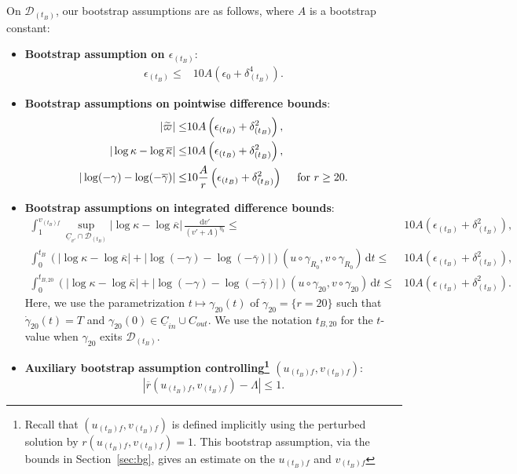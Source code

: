 \documentclass[10pt, reqno]{amsart}
\theoremstyle{definition}
\theoremstyle{remark}
\theoremstyle{conjecture}
\numberwithin{equation}{section}
\newcommand{\abs}[1]{\vert#1\vert}
\newcommand{\set}[1]{\{#1\}}
\newcommand{\ep}{\epsilon}
\newcommand{\ud}{\mathrm{d}}
\newcommand{\0}{\emptyset}
\newcommand{\gmm}{\gamma}
\newcommand{\dlt}{\delta}
\newcommand{\eps}{\epsilon}
\newcommand{\kpp}{\kappa}
\newcommand{\lmb}{\lambda}
\newcommand{\Lmb}{\Lambda}
\newcommand{\calD}{\mathcal D}
\newcommand{\uC}{\underline{C}}
\newcommand{\dur}{\nu}
\newcommand{\dvr}{\lmb}
\newcommand{\de}{\delta}
\newcommand{\rbg}{\overline{r}}					%
\newcommand{\varpibg}{\overline{\varpi}}				%
\newcommand{\kppbg}{\overline{\kpp}}					%
\newcommand{\gmmbg}{\overline{\gmm}}					%
\newcommand{\varpidf}{\widetilde{\varpi}}				%
\newcommand{\Abs}[1]{\left\vert #1 \right\vert}
\begin{document}
On $\calD_{(t_{B})}$, our bootstrap assumptions are as follows, where $A$ is a bootstrap constant:
\begin{itemize}
\item {\bf Bootstrap assumption on $\ep_{(t_B)}$}:
\begin{align}
\ep_{(t_B)}\leq & 10 A \left(\ep_0 + \de_{(t_B)}^4 \right). \label{eq:en-btstrp-eps} 
\end{align}

\item {\bf Bootstrap assumptions on pointwise difference bounds}:
\begin{align} 
	\abs{\varpidf} \leq& 10 A \left( \eps_{(t_{B})} + \dlt_{(t_{B})}^{2} \right),  \label{eq:en-btstrp-m} \\
	\abs{\log \kpp - \log \kppbg} \leq& 10 A \left( \eps_{(t_{B})} + \dlt_{(t_{B})}^{2} \right), \label{eq:en-btstrp-kpp}\\
	\abs{\log (-\gmm) - \log (-\gmmbg)} \leq& 10 \frac{A}{r} \left( \eps_{(t_{B})} + \dlt_{(t_{B})}^{2} \right)  \quad \hbox{ for } r \geq 20. \label{eq:en-btstrp-gmm}
\end{align}

\item {\bf Bootstrap assumptions on integrated difference bounds}:
\begin{align} 
	\int_{1}^{v_{(t_{B}) f}} \sup_{\uC_{v'} \cap \calD_{(t_{B})}} \Abs{\log \kpp - \log \kppbg}  \, \frac{\ud v'}{(v' + \Lmb)^{\eta_{0}}}
	\leq & 10 A \left( \eps_{(t_{B})} + \dlt_{(t_{B})}^{2} \right), \label{eq:en-btstrp-kpp-int}\\
	\int_{0}^{t_{B}} \left( \Abs{\log \kpp - \log \kppbg} + \Abs{\log (-\gmm) - \log (-\gmmbg)} \right)(u \circ \gmm_{R_{0}}, v \circ \gmm_{R_{0}}) \, \ud t
	\leq & 10 A \left( \eps_{(t_{B})} + \dlt_{(t_{B})}^{2} \right),	\label{eq:en-btstrp-int} \\
	\int_{0}^{t_{B, 20}} \left( \Abs{\log \kpp - \log \kppbg} + \Abs{\log (-\gmm) - \log (-\gmmbg)} \right)(u \circ \gmm_{20}, v \circ \gmm_{20}) \, \ud t
	\leq & 10 A \left( \eps_{(t_{B})} + \dlt_{(t_{B})}^{2} \right).	\label{eq:en-btstrp-int-20} 
\end{align}
Here, we use the parametrization $t \mapsto \gmm_{20}(t)$ of $\gmm_{20} = \set{r = 20}$ such that $\dot{\gmm}_{20}(t) = T$ and $\gmm_{20}(0) \in \uC_{in} \cup C_{out}$. We use the notation $t_{B, 20}$ for the $t$-value when $\gmm_{20}$ exits $\calD_{(t_{B})}$.

\item {\bf Auxiliary bootstrap assumption controlling\footnote{Recall that $(u_{(t_B)f}, v_{(t_B)f})$ is defined implicitly using the perturbed solution by $r(u_{(t_B)f}, v_{(t_B)f})=1$. This bootstrap assumption, via the bounds in Section~\ref{sec:bg}, gives an estimate on the $u_{(t_B)f}$ and $v_{(t_B)f}$} $(u_{(t_B)f}, v_{(t_B)f})$}:
\begin{equation}\label{eq:en-btstrp-R-Lmb}
|\rbg(u_{(t_B)f}, v_{(t_B)f}) - \Lambda |\leq 1.
\end{equation}
\end{itemize}
\end{document}
